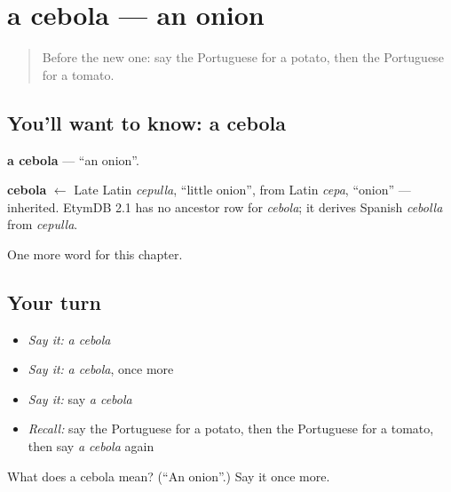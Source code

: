 \section[a cebola]{a cebola — an onion}

\label{lesson:PT-C46-cebola}



\begin{quote}
Before the new one: say the Portuguese for a potato, then the Portuguese for a tomato.
\end{quote}

\subsection*{You'll want to know: a cebola}
\textbf{a cebola} — \textquotedblleft{}an onion\textquotedblright{}.

\begin{cousinweb}
\textbf{cebola} $\leftarrow$ Late Latin \emph{cepulla}, \textquotedblleft{}little onion\textquotedblright{}, from Latin \emph{cepa}, \textquotedblleft{}onion\textquotedblright{} — inherited. EtymDB 2.1 has no ancestor row for \emph{cebola}; it derives Spanish \emph{cebolla} from \emph{cepulla}.
\end{cousinweb}

\begin{grammarlens}[title={What you've built}]
One more word for this chapter.
\end{grammarlens}

\subsection*{Your turn}
\begin{itemize}
\raggedright
  \item \emph{Say it:} \emph{a cebola}
  \item \emph{Say it:} \emph{a cebola}, once more
  \item \emph{Say it:} say \emph{a cebola}
  \item \emph{Recall:} say the Portuguese for a potato, then the Portuguese for a tomato, then say \emph{a cebola} again
\end{itemize}

\begin{tcolorbox}[breakable,colback=teal!4,colframe=teal!35!black,title={Before you move on}]
What does a cebola mean? (\textquotedblleft{}An onion\textquotedblright{}.) Say it once more.
\end{tcolorbox}
